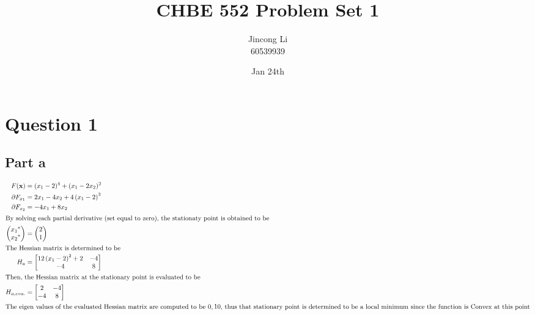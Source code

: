 \documentclass[a4paper,12pt]{article} %
\begin{document}
\newcommand{\vect}[1]{\mathbf{#1}}

\title{CHBE 552 Problem Set 1}
\author{Jincong Li \\ 60539939}
\date{Jan 24th}
\maketitle

\section{\textbf{Question 1}}

\subsection{Part a}

\begin{align*}
F( \vect{x} )  &= (x_1 - 2)^4 + (x_1-2x_2)^2 \\
\partial F_{x_1} &= 2 x_{1} - 4 x_{2} + 4 \left(x_{1} - 2\right)^{3} \\
\partial F_{x_2} &= -4x_1 + 8x_2\\
\intertext{By solving each partial derivative (set equal to zero), the stationaty point is obtained to be}
\begin{pmatrix} 
{x_1}^* \\ {x_2}^* 
\end{pmatrix}
&= 
\begin{pmatrix} 
2\\1
\end{pmatrix}
\\
\intertext{The Hessian matrix is determined to be}
H_a &= \left[\begin{matrix}12 \left(x_{1} - 2\right)^{2} + 2 & -4\\-4 & 8\end{matrix}\right]\\
\intertext{Then, the Hessian matrix at the stationary point is evaluated to be}
H_{a,eva.}&=\left[\begin{matrix}2 & -4\\-4 & 8\end{matrix}\right]\\
\intertext{The eigen values of the evaluated Hessian matrix are computed to be $0, 10$, thus that stationary point is determined to be a local minimum since the function is Convex at this point}
\end{align*}
\end{document}

